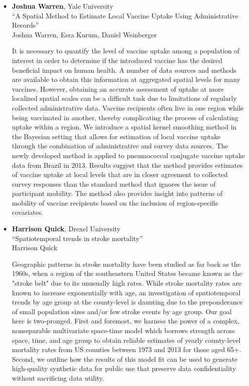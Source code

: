\begin{itemize}
\item \textbf{Joshua Warren}, Yale University \\
``A Spatial Method to Estimate Local Vaccine Uptake Using Administrative Records'' \\
Joshua Warren, Esra Kurum, Daniel Weinberger


It is necessary to quantify the level of vaccine uptake among a population of interest in order to determine if the introduced vaccine has the desired beneficial impact on human health.  A number of data sources and methods are available to obtain this information at aggregated spatial levels for many vaccines.  However, obtaining an accurate assessment of uptake at more localized spatial scales can be a difficult task due to limitations of regularly collected administrative data.  Vaccine recipients often live in one region while being vaccinated in another, thereby complicating the process of calculating uptake within a region.  We introduce a spatial kernel smoothing method in the Bayesian setting that allows for estimation of local vaccine uptake through the combination of administrative and survey data sources.  The newly developed method is applied to pneumococcal conjugate vaccine uptake data from Brazil in 2013.  Results suggest that the method provides estimates of vaccine uptake at local levels that are in closer agreement to collected survey responses than the standard method that ignores the issue of participant mobility.  The method also provides insight into patterns of mobility of vaccine recipients based on the inclusion of region-specific covariates.         

\item \textbf{Harrison Quick}, Drexel University \\
``Spatiotemporal trends in stroke mortality'' \\
Harrison Quick


Geographic patterns in stroke mortality have been studied as far back as the 1960s, when a region of the southeastern United States became known as the "stroke belt" due to its unusually high rates. While stroke mortality rates are known to increase exponentially with age, an investigation of spatiotemporal trends by age group at the county-level is daunting due to the preponderance of small population sizes and/or few stroke events by age group. Our goal here is two-pronged.  First and foremost, we harness the power of a complex, nonseparable multivariate space-time model which borrows strength across space, time, and age group to obtain reliable estimates of yearly county-level mortality rates from US counties between 1973 and 2013 for those aged 65+. Second, we outline how the results of this model fit can be used to generate high-quality synthetic data for public use that preserve data confidentiality without sacrificing data utility.


\end{itemize}
